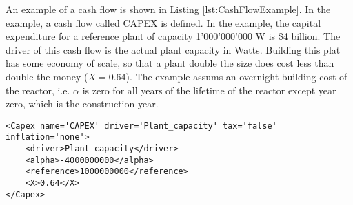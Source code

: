 An example of a cash flow is shown in Listing \ref{lst:CashFlowExample}. In the example, a cash flow called CAPEX is defined.
In the example, the capital expenditure for a reference plant of capacity
 1'000'000'000 W is \$4 billion. The driver of this cash flow is the actual plant capacity in Watts. Building this plat has some economy
 of scale, so that a plant double the size does cost
less than double the money ($X=0.64$). The example assums an overnight building cost of the reactor, i.e. $\alpha$ is zero for
all years of the lifetime of the reactor except year zero, which is the construction year.

\begin{lstlisting}[style=XML,morekeywords={anAttribute},caption=CashFlow input example., label=lst:CashFlowExample]
<Capex name='CAPEX' driver='Plant_capacity' tax='false' inflation='none'>
    <driver>Plant_capacity</driver>
    <alpha>-4000000000</alpha>
    <reference>1000000000</reference>
    <X>0.64</X>
</Capex>
\end{lstlisting}
